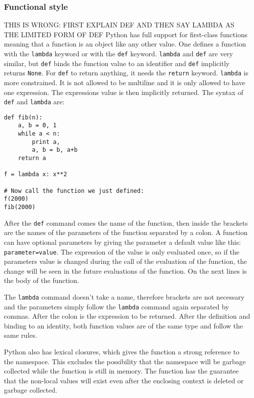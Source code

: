\subsubsection{Functional style}

THIS IS WRONG: FIRST EXPLAIN DEF AND THEN SAY LAMBDA AS THE LIMITED FORM OF DEF
Python has full support for first-class functions meaning that a function is an
object like any other value. One defines a function with the \texttt{lambda}
keyword or with the \texttt{def} keyword. \texttt{lambda} and \texttt{def} are
very similar, but \texttt{def} binds the function value to an identifier and
\texttt{def} implicitly returns \texttt{None}. For \texttt{def} to return
anything, it needs the \texttt{return} keyword. \texttt{lambda} is more
constrained. It is not allowed to be multiline and it is only allowed to have
one expression. The expressions value is then implicitly returned. The syntax
of \verb;def; and \verb;lambda; are:
\begin{verbatim}
def fib(n):
    a, b = 0, 1
    while a < n:
        print a,
        a, b = b, a+b
    return a

f = lambda x: x**2

# Now call the function we just defined:
f(2000)
fib(2000)
\end{verbatim}
After the \verb;def; command comes the name of the function, then inside the
brackets are the names of the parameters of the function separated by a colon.
A function can have optional parameters by giving the parameter a default value
like this: \verb;parameter=value;. The expression of the value is only
evaluated once, so if the parameters value is changed during the call of the
evaluation of the function, the change will be seen in the future evaluations
of the function. On the next lines is the body of the function.

The \verb;lambda; command doesn't take a name, therefore brackets are not
necessary and the parameters simply follow the \verb;lambda; command again
separated by commas. After the colon is the expression to be returned. After
the definition and binding to an identity, both function values are of the same
type and follow the same rules.

Python also has lexical closures, which gives the function a strong reference to the namespace. This excludes the possibility that the namespace will be garbage collected while the function is still in memory. The function has the guarantee that the non-local values will exist even after the enclosing context is deleted or garbage collected.

